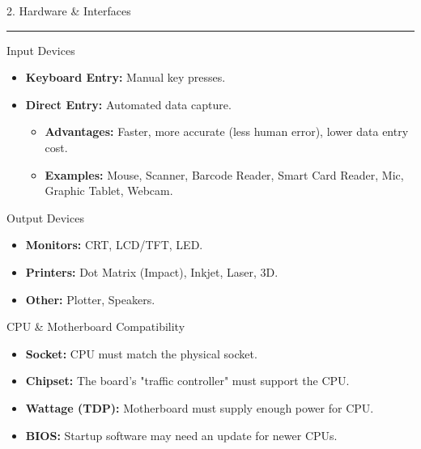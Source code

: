 \documentclass[a4paper, 8pt]{extarticle}
\newcommand{\sectionheading}[1]{%
  \par\vspace{0.6em} %
  {\headingfont\fontsize{10.5pt}{11.5pt}\selectfont\color{black}#1}\par\nopagebreak
  \rule{\linewidth}{0.4pt}\vspace{0.2em}\nopagebreak
}
\newcommand{\subsectionheading}[1]{%
  \par\vspace{0.3em}\nopagebreak
  {\headingfont\fontsize{9pt}{10pt}\selectfont\color{black!80}#1}\par\nopagebreak\vspace{-0.3em}
}
\begin{document}
\begin{multicols}{2}
\sectionheading{2. Hardware \& Interfaces}
\subsectionheading{Input Devices}
\begin{itemize}
    \item \textbf{Keyboard Entry:} Manual key presses.
    \item \textbf{Direct Entry:} Automated data capture.
        \begin{itemize}
            \item \textbf{Advantages:} Faster, more accurate (less human error), lower data entry cost.
            \item \textbf{Examples:} Mouse, Scanner, Barcode Reader, Smart Card Reader, Mic, Graphic Tablet, Webcam.
        \end{itemize}
\end{itemize}
\subsectionheading{Output Devices}
\begin{itemize}
    \item \textbf{Monitors:} CRT, LCD/TFT, LED.
    \item \textbf{Printers:} Dot Matrix (Impact), Inkjet, Laser, 3D.
    \item \textbf{Other:} Plotter, Speakers.
\end{itemize}

\subsectionheading{CPU \& Motherboard Compatibility}
\begin{itemize}
    \item \textbf{Socket:} CPU must match the physical socket.
    \item \textbf{Chipset:} The board's "traffic controller" must support the CPU.
    \item \textbf{Wattage (TDP):} Motherboard must supply enough power for CPU.
    \item \textbf{BIOS:} Startup software may need an update for newer CPUs.
\end{itemize}

\columnbreak %


\end{multicols}
\end{document}
